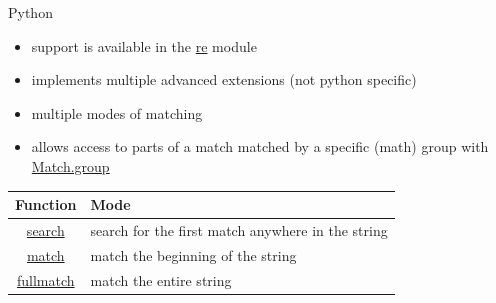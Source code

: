 \documentclass[10pt, graphics, aspectratio=169, table]{beamer}
\begin{document}
    \begin{frame}[fragile]{Python}
        \begin{itemize}
            \item support is available in the \href{https://docs.python.org/3/library/re.html}{re} module
            \item implements multiple advanced extensions (not python specific)
            \item multiple modes of matching
            \item allows access to parts of a match matched by a specific (math) group with \href{https://docs.python.org/3/library/re.html#re.Match.group}{Match.group}
        \end{itemize}
        \begin{center}
            \begin{tabular}{cl}
                \toprule
                Function & Mode \\
                \midrule
                \href{https://docs.python.org/3/library/re.html#re.search}{search} & search for the first match anywhere in the string \\
                \href{https://docs.python.org/3/library/re.html#re.match}{match} & match the beginning of the string \\
                \href{https://docs.python.org/3/library/re.html#re.fullmatch}{fullmatch} & match the entire string \\
                \bottomrule
            \end{tabular}
        \end{center}
    \end{frame}
\end{document}
